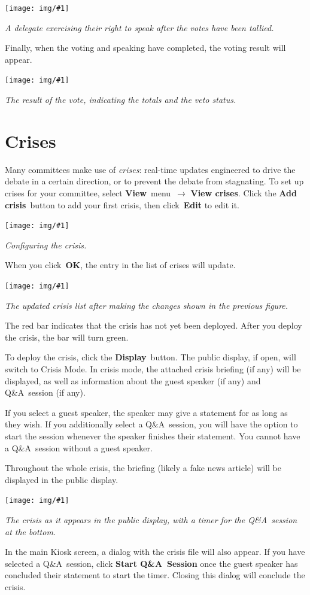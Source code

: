 \documentclass{article}
\newcommand{\navstep}[2]{\navitem{#1}~{#2}~$\rightarrow$}
\newcommand{\navitem}[1]{\textbf{#1}}
\newcommand{\encouragebreak}[1]{\vfil\penalty-#1\vfilneg}
\newcommand{\img}[2]{%
  \begin{center}
    \vspace{6pt}
    \encouragebreak{100}
    \centerline{\texttt{[image: img/\#1]}}
    {\slshape #2}
    \encouragebreak{300}
  \end{center}
}
\begin{document}
\img{substantive_vote_with_rights}{A delegate exercising their right to speak after the votes have been tallied.}

Finally, when the voting and speaking have completed, the voting result will appear.

\img{substantive_vote_result}{The result of the vote, indicating the totals and the veto status.}

\section{Crises}
\label{sec:crises}

Many committees make use of \emph{crises}: real-time updates engineered to drive the debate in a certain direction, or to prevent the debate from stagnating.
To set up crises for your committee, select \navstep{View}{menu} \navitem{View crises}.
Click the \navitem{Add crisis}~button to add your first crisis, then click~\navitem{Edit} to edit it.

\img{crisis_configuration}{Configuring the crisis.}

When you click~\navitem{OK}, the entry in the list of crises will update.

\img{crisis_list}{The updated crisis list after making the changes shown in the previous figure.}

The red bar indicates that the crisis has not yet been deployed. After you deploy the crisis, the bar will turn green.

To deploy the crisis, click the \navitem{Display}~button.
The public display, if open, will switch to Crisis Mode.
In crisis mode, the attached crisis briefing (if any) will be displayed, as well as information about the guest speaker (if any) and Q\&A~session (if any).

If you select a guest speaker, the speaker may give a statement for as long as they wish.
If you additionally select a Q\&A~session, you will have the option to start the session whenever the speaker finishes their statement.
You cannot have a Q\&A~session without a guest speaker.

Throughout the whole crisis, the briefing (likely a fake news article) will be displayed in the public display.

\img{crisis_ongoing}{The crisis as it appears in the public display, with a timer for the Q\&A~session at the bottom.}

In the main Kiosk screen, a dialog with the crisis file will also appear.
If you have selected a Q\&A~session, click \navitem{Start Q\&A~Session} once the guest speaker has concluded their statement to start the timer.
Closing this dialog will conclude the crisis.
\end{document}
